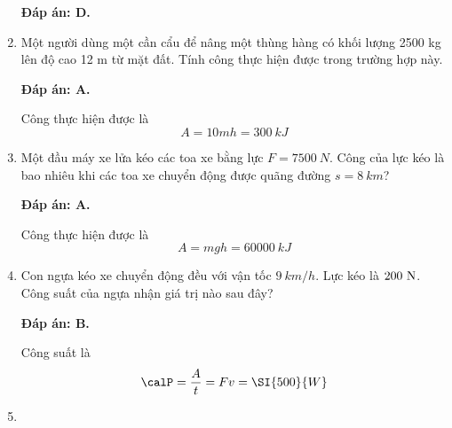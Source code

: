 \begin{enumerate}[label=\bfseries Câu \arabic*:]
	\hideall
	{	
		\textbf{Đáp án: D.}
	}
		\item {}
	
	
	{
		Một người dùng một cần cẩu để nâng một thùng hàng có khối lượng 2500 kg lên độ cao 12 m từ mặt đất. Tính công thực hiện được trong trường hợp này.
		
	}
	
	\hideall
	{	
		\textbf{Đáp án: A.}
		
		Công thực hiện được là
		$$A=10mh=\SI{300}{kJ}$$
	}
		\item {}
	
	
	{
		Một đầu máy xe lửa kéo các toa xe bằng lực $F=\SI{7500}{N}$. Công của lực kéo là bao nhiêu khi các toa xe chuyển động được quãng đường $s=\SI{8}{km}$?
		
	}
	
	\hideall
	{	
		\textbf{Đáp án: A.}
		
		Công thực hiện được là
		$$A=mgh=\SI{60000}{kJ}$$
	}
		\item {}
	
	
	{
		Con ngựa kéo xe chuyển động đều với vận tốc $\SI{9}{km/h}$. Lực kéo là $200\ \text N$. Công suất của ngựa nhận giá trị nào sau đây?
		
	}
	
	\hideall
	{	
		\textbf{Đáp án: B.}
		
		Công suất là
		$$\calP = \dfrac{A}{t} = Fv=\SI{500}{W}$$
	}
		\item {}
	

\end{enumerate}
